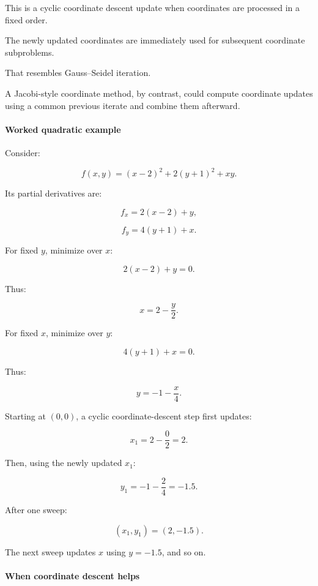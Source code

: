 This is a cyclic coordinate descent update when coordinates are processed in a fixed order.

The newly updated coordinates are immediately used for subsequent coordinate subproblems.

That resembles Gauss--Seidel iteration.

A Jacobi-style coordinate method, by contrast, could compute coordinate updates using a common previous iterate and combine them afterward.

\paragraph{Worked quadratic example}\label{02-foundations-ii-ch027-worked-quadratic-example}

\hypertarget{02-foundations-ii-ch027-worked-quadratic-example}{}

Consider:

\[
f(x,y)= (x-2)^2+2(y+1)^2+xy.
\]

Its partial derivatives are:

\[
f_x=2(x-2)+y,
\]

\[
f_y=4(y+1)+x.
\]

For fixed \(y\), minimize over \(x\):

\[
2(x-2)+y=0.
\]

Thus:

\[
\boxed{x=2-\frac y2}.
\]

For fixed \(x\), minimize over \(y\):

\[
4(y+1)+x=0.
\]

Thus:

\[
\boxed{y=-1-\frac x4}.
\]

Starting at \((0,0)\), a cyclic coordinate-descent step first updates:

\[
x_1=2-\frac02=2.
\]

Then, using the newly updated \(x_1\):

\[
y_1=-1-\frac24=-1.5.
\]

After one sweep:

\[
\boxed{(x_1,y_1)=(2,-1.5)}.
\]

The next sweep updates \(x\) using \(y=-1.5\), and so on.

\paragraph{When coordinate descent helps}\label{02-foundations-ii-ch027-when-coordinate-descent-helps}

